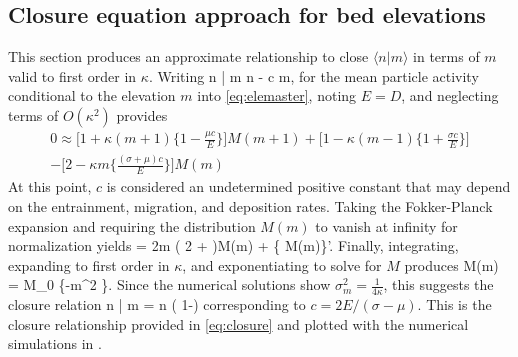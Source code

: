 \subsection{Closure equation approach for bed elevations}
\DIFaddbegin \label{sec:err}
\DIFaddend This section produces an approximate relationship to close
$\langle n | m \rangle$ in terms of $m$ valid to first order in $\kappa$. Writing 
\be \langle n | m \rangle \approx \langle n \rangle  - \kappa c m,\ee
for the mean particle activity conditional to the elevation $m$ into \DIFaddbegin {}\DIFaddend \ref{eq:elemaster}, noting $E=D$, and neglecting terms of $O(\kappa^2)$ provides 
\begin{multline} 0 \approx \Big[ 1+\kappa(m+1)\Big\{ 1-\frac{\mu c}{E}\Big\}\Big]M(m+1) + \Big[1-\kappa(m-1)\Big\{1+\frac{\sigma c}{E}\Big\}\Big]\\-\Big[2-\kappa m\Big\{\frac{(\sigma+\mu)c}{E}\Big\}\Big]M(m)
\end{multline}
At this point, $c$ is considered an undetermined positive constant that may depend on the entrainment, migration, and deposition rates.
Taking the Fokker-Planck expansion and requiring the distribution $M(m)$ to vanish at infinity for normalization yields
 = 2\kappa m \Big( 2 + \Big)M(m) + \Big\{
M(m)\Big\}'.\ee
Finally, integrating, expanding to first order in $\kappa$, and exponentiating to solve for $M$ produces
\be M(m) = M_0 \exp\Big\{-\kappa m^2 \Big\}. \DIFaddbegin \label{eq:zap}\DIFaddend \ee
Since the numerical solutions show $\sigma_m^2 = \frac{1}{4\kappa}$, this suggests the closure relation
\be \langle n | m \rangle = \langle n \rangle\Big( 1-\Big) \DIFaddbegin \label{eq:zim}\DIFaddend \ee
corresponding to $c=2E/(\sigma-\mu)$. This is the closure relationship provided in \DIFdelbegin {}\DIFdelend \DIFaddbegin {}\DIFaddend \ref{eq:closure} and plotted with the numerical simulations in \DIFdelbegin {}\DIFdelend \DIFaddbegin {}\DIFaddend .
